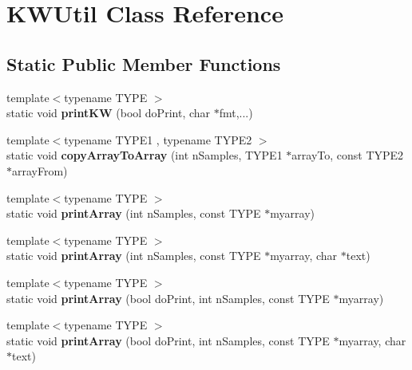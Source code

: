 \hypertarget{class_k_w_util}{}\section{K\+W\+Util Class Reference}
\label{class_k_w_util}
\subsection*{Static Public Member Functions}
\begin{DoxyCompactItemize}
\item 
\mbox{\label{class_k_w_util_a5d14be8edc626d6b30b31c8d85c64d00}} 
{\footnotesize template$<$typename T\+Y\+PE $>$ }\\static void {\bfseries print\+KW} (bool do\+Print, char $\ast$fmt,...)
\item 
\mbox{\label{class_k_w_util_a74cbba48bf115ff4ddb90e4c8abfaaac}} 
{\footnotesize template$<$typename T\+Y\+P\+E1 , typename T\+Y\+P\+E2 $>$ }\\static void {\bfseries copy\+Array\+To\+Array} (int n\+Samples, T\+Y\+P\+E1 $\ast$array\+To, const T\+Y\+P\+E2 $\ast$array\+From)
\item 
\mbox{\label{class_k_w_util_a9a809d578ed4b3647b7a92a8ee349a0e}} 
{\footnotesize template$<$typename T\+Y\+PE $>$ }\\static void {\bfseries print\+Array} (int n\+Samples, const T\+Y\+PE $\ast$myarray)
\item 
\mbox{\label{class_k_w_util_aa537bb86732154b9ad1317e851afccfd}} 
{\footnotesize template$<$typename T\+Y\+PE $>$ }\\static void {\bfseries print\+Array} (int n\+Samples, const T\+Y\+PE $\ast$myarray, char $\ast$text)
\item 
\mbox{\label{class_k_w_util_a551666cf04781258441f4d5a77c6a7d8}} 
{\footnotesize template$<$typename T\+Y\+PE $>$ }\\static void {\bfseries print\+Array} (bool do\+Print, int n\+Samples, const T\+Y\+PE $\ast$myarray)
\item 
\mbox{\label{class_k_w_util_a5eafacfaa0ea74867d2b37cf22558644}} 
{\footnotesize template$<$typename T\+Y\+PE $>$ }\\static void {\bfseries print\+Array} (bool do\+Print, int n\+Samples, const T\+Y\+PE $\ast$myarray, char $\ast$text)

\end{DoxyCompactItemize}
